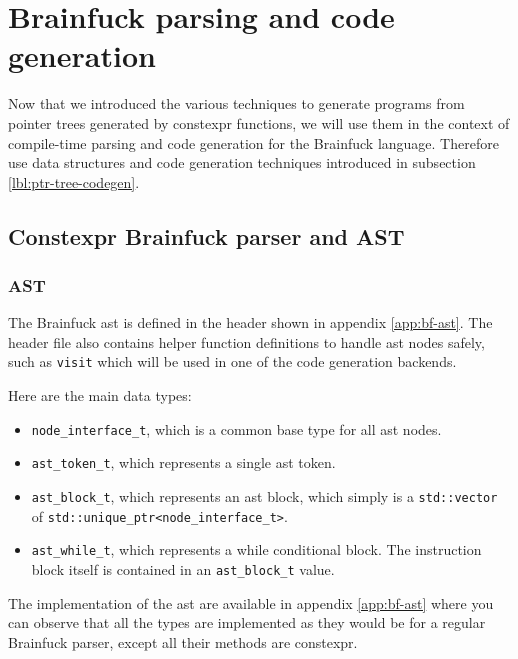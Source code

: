 \documentclass[../main]{subfiles}
\begin{document}
\section{
  Brainfuck parsing and code generation
}

Now that we introduced the various techniques to generate programs from
pointer trees generated by \gls{constexpr} functions, we will use them in the
context of compile-time parsing and code generation for the Brainfuck language.
Therefore use data structures and code generation techniques introduced in
subsection \ref{lbl:ptr-tree-codegen}.

\subsection{
  Constexpr Brainfuck parser and AST
}

\subsubsection{
  AST
}

The Brainfuck \gls{ast} is defined in the header shown in appendix \ref{app:bf-ast}.
The header file also contains helper function definitions to handle \gls{ast} nodes
safely, such as \lstinline{visit} which will be used in one of the
code generation backends.

Here are the main data types:

\begin{itemize}
\item
\lstinline{node_interface_t}, which is a common base type for all \gls{ast} nodes.

\item
\lstinline{ast_token_t}, which represents a single \gls{ast} token.

\item
\lstinline{ast_block_t}, which represents an \gls{ast} block, which simply is a
\lstinline{std::vector} of \lstinline{std::unique_ptr<node_interface_t>}.

\item
\lstinline{ast_while_t}, which represents a while conditional block.
The instruction block itself is contained in an \lstinline{ast_block_t} value.

\end{itemize}

The implementation of the \gls{ast} are available in appendix \ref{app:bf-ast}
where you can observe that all the types are implemented as they would be
for a regular Brainfuck parser, except all their methods are \gls{constexpr}.
\end{document}
